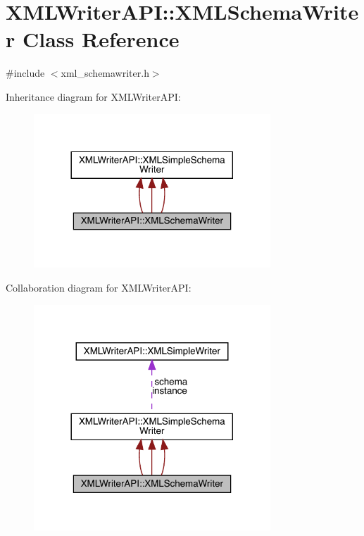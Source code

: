 \hypertarget{classXMLWriterAPI_1_1XMLSchemaWriter}{}\section{X\+M\+L\+Writer\+A\+PI\+:\+:X\+M\+L\+Schema\+Writer Class Reference}
\label{classXMLWriterAPI_1_1XMLSchemaWriter}


{\ttfamily \#include $<$xml\+\_\+schemawriter.\+h$>$}



Inheritance diagram for X\+M\+L\+Writer\+A\+PI\+:
\nopagebreak
\begin{figure}[H]
\begin{center}
\leavevmode
\includegraphics[width=252pt]{de/d07/classXMLWriterAPI_1_1XMLSchemaWriter__inherit__graph}
\end{center}
\end{figure}


Collaboration diagram for X\+M\+L\+Writer\+A\+PI\+:
\nopagebreak
\begin{figure}[H]
\begin{center}
\leavevmode
\includegraphics[width=252pt]{de/dbe/classXMLWriterAPI_1_1XMLSchemaWriter__coll__graph}
\end{center}
\end{figure}
